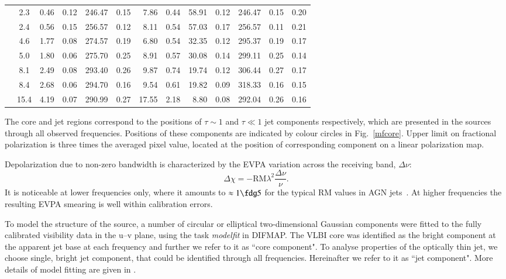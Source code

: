 \documentclass[a4paper,fleqn,usenatbib,useAMS]{mnras}
\begin{document}
\begin{table*}
\begin{minipage}{175mm}
\begin{center}
\begin{tabular}{@{}lcr@{$\pm$}lr@{$\pm$}lr@{$\pm$}lr@{$\pm$}lr@{$\pm$}lc@{}}
 & 2.3 & 0.46 & 0.12 & 246.47 & 0.15 & 7.86 & 0.44 & 58.91 & 0.12 & 246.47 & 0.15 & 0.20\\
 & 2.4 & 0.56 & 0.15 & 256.57 & 0.12 & 8.11 & 0.54 & 57.03 & 0.17 & 256.57 & 0.11 & 0.21\\
 & 4.6 & 1.77 & 0.08 & 274.57 & 0.19 & 6.80 & 0.54 & 32.35 & 0.12 & 295.37 & 0.19 & 0.17\\
 & 5.0 & 1.80 & 0.06 & 275.70 & 0.25 & 8.91 & 0.57 & 30.08 & 0.14 & 299.11 & 0.25 & 0.14\\
 & 8.1 & 2.49 & 0.08 & 293.40 & 0.26 & 9.87 & 0.74 & 19.74 & 0.12 & 306.44 & 0.27 & 0.17\\
 & 8.4 & 2.68 & 0.06 & 294.70 & 0.16 & 9.54 & 0.61 & 19.82 & 0.09 & 318.33 & 0.16 & 0.15\\
 & 15.4 & 4.19 & 0.07 & 290.99 & 0.27 & 17.55 & 2.18 & 8.80 & 0.08 & 292.04 & 0.26 & 0.16\\
\hline
\end{tabular}
\end{center}

\medskip
 The core and jet regions correspond to the positions of $\tau\sim1$ and $\tau\ll1$ jet components respectively, which are presented in the sources through all observed frequencies. Positions of these components are indicated by colour circles in Fig.~\ref{mfcore}.
 Upper limit on fractional polarization is three times the averaged pixel value, located at the position of corresponding component on a linear polarization map.
\end{minipage}
\end{table*}
 
 
Depolarization due to non-zero bandwidth \citep{gardner_whiteoak_66} is characterized by the EVPA variation across the receiving band, $\Delta\nu$:
\begin{equation}
\Delta \chi=-{\mathrm{RM}}\lambda^2{\frac{\Delta\nu}{\nu}}. 
\end{equation}
It is noticeable at lower frequencies only, where it amounts to $\approx1\fdg5$ for the typical RM values in AGN jets~\citep[e.g.][]{zavala_taylor_03}.
At higher frequencies the resulting EVPA smearing is well within calibration errors.

To model the structure of the source, a number of circular or elliptical two-dimensional Gaussian components were fitted to the fully calibrated visibility data in the u--v plane, using the task \textit{modelfit} in DIFMAP. 
The VLBI core was identified as the bright component at the apparent jet base at each frequency and further we refer to it as ``core component". 
To analyse properties of the optically thin jet, we choose single, bright jet component, that could be identified through all frequencies.
Hereinafter we refer to it as ``jet component".
More details of model fitting are given in \citet{sokolovsky_etal11}.
\end{document}
